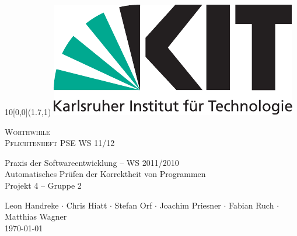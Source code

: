 
\newcommand{\diameter}{20}
\newcommand{\xone}{-30}
\newcommand{\xtwo}{150}
\newcommand{\yone}{15}
\newcommand{\ytwo}{-265}

\begin{titlepage}

	\begin{textblock}{10}[0,0](1.7,1)
		\includegraphics[width=.3\textwidth]{images/kit_logo_de_4c_positiv.pdf}
	\end{textblock}
	\begin{center}
		\fontsize{45}{50}\selectfont
        \vfill
        \textsc{Worthwhile} \\
        \textsc{Pflichtenheft}
        \vfill
		\LARGE
		PSE WS 11/12
  \vfill
 \newpage
 
 \null
 \vfill
 
 Praxis der Softwareentwicklung -- WS 2011/2010 \\
 
  \Large
  Automatisches Prüfen der Korrektheit von Programmen \\
  Projekt 4 -- Gruppe 2 \\
  \medskip
  \vspace{2cm}
  
    Leon Handreke $\cdot$ Chris Hiatt $\cdot$ Stefan Orf $\cdot$ Joachim Priesner $\cdot$ Fabian Ruch $\cdot$ Matthias Wagner
  \vspace{2cm} \\
  \today
	\end{center}
	
  \vfill

\end{titlepage}
